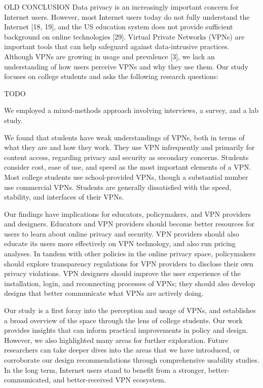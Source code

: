 OLD CONCLUSION
Data privacy is an increasingly important concern for Internet users. However,
most Internet users today do not fully understand the Internet [18, 19], and
the US education system does not provide sufficient background on online
technologies [29]. Virtual Private Networks (VPNs) are important tools that
can help safeguard against data-intrusive practices. Although VPNs are growing
in usage and prevalence [3], we lack an understanding of how users perceive
VPNs and why they use them. Our study focuses on college students and asks the
following research questions:

TODO

We employed a mixed-methods approach involving interviews, a survey, and a lab
study.

We found that students have weak understandings of VPNs, both in terms of what
they are and how they work. They use VPN infrequently and primarily for
content access, regarding privacy and security as secondary concerns. Students
consider cost, ease of use, and speed as the most important elements of a VPN.
Most college students use school-provided VPNs, though a substantial number
use commercial VPNs. Students are generally dissatisfied with the speed,
stability, and interfaces of their VPNs.

Our findings have implications for educators, policymakers, and VPN providers
and designers. Educators and VPN providers should become better resources for
users to learn about online privacy and security. VPN providers should also
educate its users more effectively on VPN technology, and also run pricing
analyses. In tandem with other policies in the online privacy space,
policymakers should explore transparency regulations for VPN providers to
disclose their own privacy violations. VPN designers should improve the user
experience of the installation, login, and reconnecting processes of VPNs;
they should also develop designs that better communicate what VPNs are
actively doing.

Our study is a first foray into the perception and usage of VPNs, and
establishes a broad overview of the space through the lens of college
students. Our work provides insights that can inform practical improvements in
policy and design. However, we also highlighted many areas for further
exploration. Future researchers can take deeper dives into the areas that we
have introduced, or corroborate our design recommendations through
comprehensive usability studies. In the long term, Internet users stand to
benefit from a stronger, better-communicated, and better-received VPN
ecosystem.


